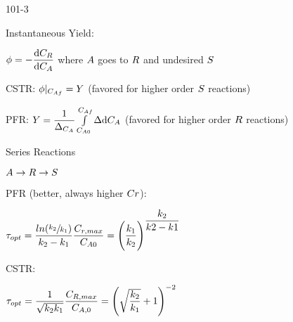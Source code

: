 \begin{mitframe}{101-3}
\begin{listone}
	\item Instantaneous Yield:
    \item $\eleccoeff=-\dfrac{\mathrm{d}\conc_{\gasconst}}{\mathrm{d}\conc_{\helmholtz}}$ where $\helmholtz$ goes to $\gasconst$ and undesired $\entropy$
    \item CSTR: $\eleccoeff|_{\conc_{\helmholtz\fug}}=Y$ (favored for higher order $\entropy$ reactions)
    \item PFR: $Y =\dfrac{1}{\iipf_{\conc_{\helmholtz}}}\int\limits_{\conc_{\helmholtz\init}}^{\conc_{\helmholtz\fug}}\iipf\mathrm{d}\conc_{\helmholtz}$ (favored for higher order $\gasconst$ reactions)
\item Series Reactions
\item $\helmholtz\rightarrow\gasconst\rightarrow\entropy$
\item PFR (better, always higher $\conc\pos$):
\item $\torque_{opt}=\dfrac{ln(\sfrac{\thermcond_2}{\thermcond_1})}{\thermcond_2-\thermcond_1}\dfrac{\conc_{\pos, max}}{\conc_{\helmholtz\init}}=\Bigg(\dfrac{\thermcond_1}{\thermcond_2}\Bigg)^{\dfrac{\thermcond_2}{\thermcond2-\thermcond1}}$
\item CSTR:
\item $\torque_{opt}=\dfrac{1}{\sqrt{\thermcond_2\thermcond_1}}\dfrac{\conc_{\gasconst, max}}{\conc_{\helmholtz,\init}}=\Bigg(\sqrt{\dfrac{\thermcond_2}{\thermcond_1}}+1\Bigg)^{-2}$
\end{listone}        
\end{mitframe}